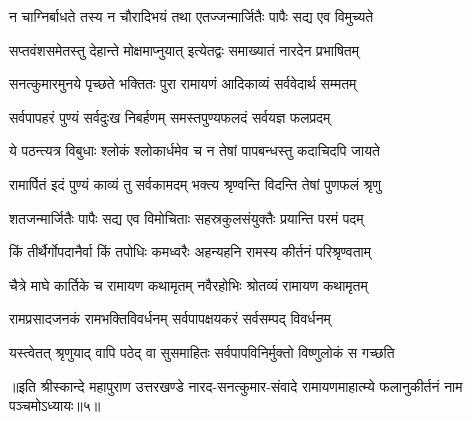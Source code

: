  

\twolineshloka
{न चाग्निर्बाधते तस्य न चौरादिभयं तथा}
{एतज्जन्मार्जितैः पापैः सद्य एव विमुच्यते}%

 

\twolineshloka
{सप्तवंशसमेतस्तु देहान्ते मोक्षमाप्नुयात्}
{इत्येतद्वः समाख्यातं नारदेन प्रभाषितम्}%

 

\twolineshloka
{सनत्कुमारमुनये पृच्छते भक्तितः पुरा}
{रामायणं आदिकाव्यं सर्ववेदार्थ सम्मतम्}%

 

\twolineshloka
{सर्वपापहरं पुण्यं सर्वदुःख निबर्हणम्}
{समस्तपुण्यफलदं सर्वयज्ञ फलप्रदम्}%

 

\twolineshloka
{ये पठन्त्यत्र विबुधाः श्लोकं श्लोकार्धमेव च}
{न तेषां पापबन्धस्तु कदाचिदपि जायते}%

 

\twolineshloka
{रामार्पितं इदं पुण्यं काव्यं तु सर्वकामदम्}
{भक्त्य श्रृण्वन्ति विदन्ति तेषां पुणफलं श्रृणु}%

 

\twolineshloka
{शतजन्मार्जितैः पापैः सद्य एव विमोचिताः}
{सहस्रकुलसंयुक्तैः प्रयान्ति परमं पदम्}%

 

\twolineshloka
{किं तीर्थैर्गोपदानैर्वा किं तपोधिः कमध्वरैः}
{अहन्यहनि रामस्य कीर्तनं परिश्रृण्वताम्}%

 

\twolineshloka
{चैत्रे माघे कार्तिके च रामायण कथामृतम्}
{नवैरहोभिः श्रोतव्यं रामायण कथामृतम्}%

 

\twolineshloka
{रामप्रसादजनकं रामभक्तिविवर्धनम्}
{सर्वपापक्षयकरं सर्वसम्पद् विवर्धनम्}%

 

\twolineshloka
{यस्त्वेतत् श्रृणुयाद् वापि पठेद् वा सुसमाहितः}
{सर्वपापविनिर्मुक्तो विष्णुलोकं स गच्छति}%

 

॥इति श्रीस्कान्दे महापुराण उत्तरखण्डे नारद-सनत्कुमार-संवादे रामायणमाहात्म्ये फलानुकीर्तनं नाम पञ्चमोऽध्यायः॥५॥
 

